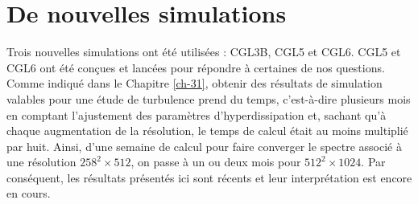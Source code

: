  \section{De nouvelles simulations}\label{sec-333}
 
 Trois nouvelles simulations ont été utilisées : CGL3B, CGL5 et CGL6. CGL5 et CGL6 ont été conçues et lancées pour répondre à certaines de nos questions. Comme indiqué dans le Chapitre \ref{ch-31}, obtenir des résultats de simulation valables pour une étude de turbulence prend du temps, c'est-à-dire plusieurs mois en comptant l'ajustement des paramètres d'hyperdissipation et, sachant qu'à chaque augmentation de la résolution, le temps de calcul était au moins multiplié par huit. Ainsi, d'une semaine de calcul pour faire converger le spectre associé à une résolution $258^2\times 512$, on passe à un ou deux mois pour $512^2 \times 1024$. Par conséquent, les résultats présentés ici sont récents et leur interprétation est encore en cours. 
 
